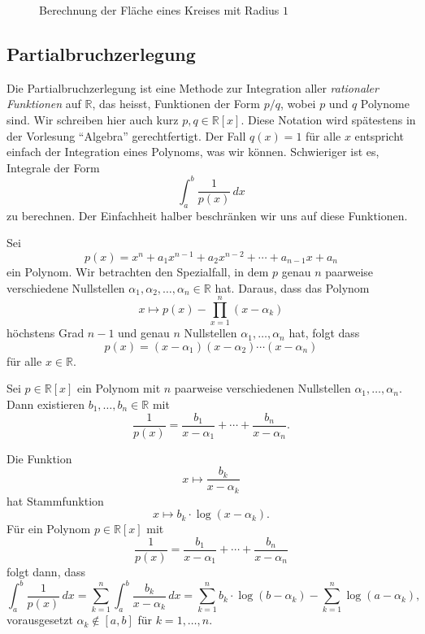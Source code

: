 \documentclass[../main.tex]{subfiles}
\begin{document}
\begin{figure}[htb]
  \centering
  
  \caption{Berechnung der Fläche eines Kreises mit Radius $1$}%
  \label{fig:circle-area}
\end{figure}

\subsection*{Partialbruchzerlegung}
Die Partialbruchzerlegung ist eine Methode
zur Integration aller \emph{rationaler Funktionen}
auf $\mathbb{R}$,
das heisst, Funktionen der Form
$p/q$, wobei $p$ und $q$ Polynome sind.
Wir schreiben hier auch kurz $p, q \in \mathbb{R}[x]$.
Diese Notation wird spätestens in der Vorlesung
``Algebra'' gerechtfertigt.
Der Fall $q(x) = 1$ für alle $x$ entspricht einfach
der Integration eines Polynoms, was wir können.
Schwieriger ist es, Integrale der Form
\[
  \int_{a}^{b} \frac{1}{p(x)} \, dx
\]
zu berechnen.
Der Einfachheit halber beschränken wir uns auf diese Funktionen.

Sei
\[
  p(x) = x^n + a_1 x^{n-1} + a_2 x^{n-2} + \cdots
  + a_{n-1} x + a_n
\]
ein Polynom.
Wir betrachten den Spezialfall,
in dem $p$ genau $n$ paarweise verschiedene
Nullstellen $\alpha_1, \alpha_2, \dots, \alpha_n \in \mathbb{R}$ 
hat.
Daraus, dass das Polynom
\[
  x \mapsto p(x) - \prod_{x=1}^{n} (x - \alpha_k)
\]
höchstens Grad $n-1$ und genau $n$ Nullstellen
$\alpha_1, \dots, \alpha_n$ hat, folgt dass
\[
  p(x) = (x - \alpha_1) (x - \alpha_2) \cdots (x - \alpha_n)
\]
für alle $x \in \mathbb{R}$.

\begin{lemma}[Partialbruchzerlegung]\label{lem:partial-fractions}
  Sei $p \in \mathbb{R}[x]$ ein Polynom mit $n$ 
  paarweise verschiedenen Nullstellen
  $\alpha_1, \dots, \alpha_n$.
  Dann existieren $b_1, \dots, b_n \in \mathbb{R}$
  mit
  \[
    \frac{1}{p(x)} = \frac{b_1}{x - \alpha_1}
    + \cdots + \frac{b_n}{x - \alpha_n}.
  \]
\end{lemma}

\begin{application}
  Die Funktion
  \[
    x \mapsto \frac{b_k}{x - \alpha_k}
  \]
  hat Stammfunktion
  \[
    x \mapsto b_k \cdot \log (x - \alpha_k).
  \]
  Für ein Polynom $p \in \mathbb{R}[x]$ mit
  \[
    \frac{1}{p(x)} = \frac{b_1}{x - \alpha_1}
    + \cdots + \frac{b_n}{x - \alpha_n}
  \]
  folgt dann, dass
  \[
    \int_{a}^{b} \frac{1}{p(x)} \, dx
    = \sum_{k=1}^{n} \int_{a}^{b} \frac{b_k}{x - \alpha_k} \, dx
    = \sum_{k=1}^{n} b_k \cdot \log(b - \alpha_k)
    - \sum_{k=1}^{n} \log(a - \alpha_k),
  \]
  vorausgesetzt $\alpha_k \notin [a, b]$ für $k = 1, \dots, n$.
\end{application}
\end{document}

